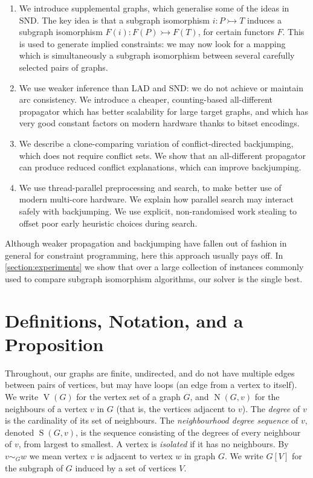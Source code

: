 \documentclass{llncs}
\begin{document}
\begin{enumerate}
    \item We introduce supplemental graphs, which generalise some of the ideas in SND. The key idea
        is that a subgraph isomorphism $i : P \rightarrowtail T$ induces a subgraph isomorphism
        $F(i) : F(P) \rightarrowtail F(T)$, for certain functors $F$.  This is used to generate
        implied constraints: we may now look for a mapping which is simultaneously a subgraph
        isomorphism between several carefully selected pairs of graphs.

    \item We use weaker inference than LAD and SND: we do not achieve or maintain arc consistency.
        We introduce a cheaper, counting-based all-different propagator which has better scalability
        for large target graphs, and which has very good constant factors on modern hardware thanks
        to bitset encodings.

    \item We describe a clone-comparing variation of conflict-directed backjumping, which does not
        require conflict sets. We show that an all-different propagator can produce reduced
        conflict explanations, which can improve backjumping.

    \item We use thread-parallel preprocessing and search, to make better use of modern multi-core
        hardware. We explain how parallel search may interact safely with backjumping. We use
        explicit, non-randomised work stealing to offset poor early heuristic choices during search.
\end{enumerate}

\noindent Although weaker propagation and backjumping have fallen out of fashion in general for
constraint programming, here this approach usually pays off. In \cref{section:experiments} we show
that over a large collection of instances commonly used to compare subgraph isomorphism algorithms,
our solver is the single best.

\section{Definitions, Notation, and a Proposition}

Throughout, our graphs are finite, undirected, and do not have multiple edges between pairs of
vertices, but may have loops (an edge from a vertex to itself). We write $\operatorname{V}(G)$ for
the vertex set of a graph $G$, and $\operatorname{N}(G, v)$ for the neighbours of a vertex $v$ in
$G$ (that is, the vertices adjacent to $v$).  The \emph{degree} of $v$ is the cardinality of its set
of neighbours. The \emph{neighbourhood degree sequence} of $v$, denoted $\operatorname{S}(G, v)$, is
the sequence consisting of the degrees of every neighbour of $v$, from largest to smallest.  A
vertex is \emph{isolated} if it has no neighbours. By $v \sim_G w$ we mean vertex $v$ is adjacent to
vertex $w$ in graph $G$. We write $G[V]$ for the subgraph of $G$ induced by a set of vertices $V$.
\end{document}
